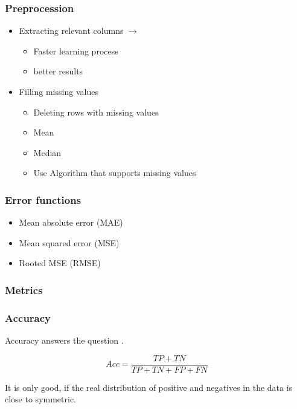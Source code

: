 \subsubsection{Preprocession}

\begin{itemize}
    \item Extracting relevant columns $\rightarrow$
          \begin{itemize}
              \item Faster learning process
              \item better results
          \end{itemize}
    \item Filling missing values
          \begin{itemize}
              \item Deleting rows with missing values
              \item Mean
              \item Median
              \item Use Algorithm that supports missing values
          \end{itemize}
\end{itemize}

\subsubsection{Error functions}

\begin{itemize}
    \item Mean absolute error (MAE)
    \item Mean squared error (MSE)
    \item Rooted MSE (RMSE)
\end{itemize}

\subsubsection{Metrics}

\subsubsection*{Accuracy}

Accuracy answers the question .

$$
    Acc = \frac{TP + TN}{TP + TN + FP + FN}
$$

It is only good, if the real distribution of positive and negatives in the data is close to symmetric.

